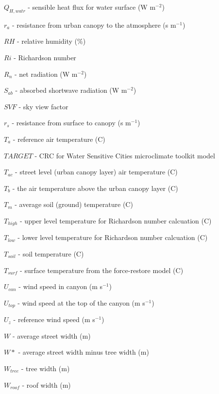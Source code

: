 {\begin{description}
\item \ensuremath{Q_{H,watr}} - sensible heat flux for water surface (W m$^{-2}$)
\item \ensuremath{r_{a}} - resistance from urban canopy to the atmosphere (s m$^{-1}$)
\item \ensuremath{RH} - relative humidity (\%)
\item \ensuremath{Ri} - Richardson number
\item \ensuremath{R_{n}} - net radiation (W m$^{-2}$)
\item \ensuremath{S_{ab}} - absorbed shortwave radiation (W m$^{-2}$)
\item \ensuremath{SVF} - sky view factor
\item \ensuremath{r_{s}} - resistance from surface to canopy (s m$^{-1}$)
\item \ensuremath{T_{a}} - reference air temperature (\degree C)
\item $TARGET$ - CRC for Water Sensitive Cities microclimate toolkit model
\item $T_{ac}$ - street level (urban canopy layer) air temperature (\degree C)
\item \ensuremath{T_{b}} - the air temperature above the urban canopy layer (\degree C)
\item \ensuremath{T_{m}} - average soil (ground) temperature (\degree C)
\item \ensuremath{T_{high}} - upper level temperature for Richardson number calcuation (\degree C)
\item \ensuremath{T_{low}} - lower level temperature for Richardson number calcuation (\degree C)
\item \ensuremath{T_{soil}} - soil temperature (\degree C)
\item $T_{surf}$ - surface temperature from the force-restore model (\degree C)
\item \ensuremath{U_{can}} - wind speed in canyon (m s$^{-1}$)
\item \ensuremath{U_{top}} - wind speed at the top of the canyon (m s$^{-1}$)
\item \ensuremath{U_{z}} - reference wind speed (m s$^{-1}$)  
\item $W$ - average street width (m)
\item $W*$ - average street width minus tree width (m)
\item $W_{tree}$ - tree width (m)
\item $W_{roof}$ - roof width (m)



\end{description}}
